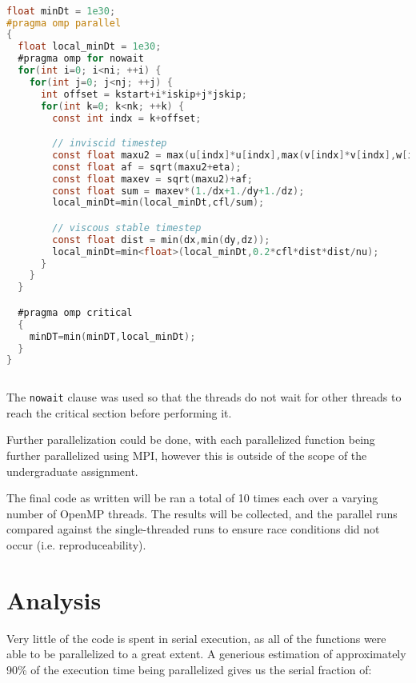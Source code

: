 \documentclass{article}
\begin{document}
  \begin{lstfloat}
  \begin{lstlisting}[language=C, 
                     linewidth=1\textwidth,
                     breaklines=true, 
                     basicstyle=\small\ttfamily]

float minDt = 1e30;
#pragma omp parallel
{
  float local_minDt = 1e30;
  #pragma omp for nowait
  for(int i=0; i<ni; ++i) {
    for(int j=0; j<nj; ++j) {
      int offset = kstart+i*iskip+j*jskip;
      for(int k=0; k<nk; ++k) {
        const int indx = k+offset;

        // inviscid timestep
        const float maxu2 = max(u[indx]*u[indx],max(v[indx]*v[indx],w[indx]*w[indx]));
        const float af = sqrt(maxu2+eta);
        const float maxev = sqrt(maxu2)+af;
        const float sum = maxev*(1./dx+1./dy+1./dz);
        local_minDt=min(local_minDt,cfl/sum);

        // viscous stable timestep
        const float dist = min(dx,min(dy,dz));
        local_minDt=min<float>(local_minDt,0.2*cfl*dist*dist/nu);
      }
    }
  }

  #pragma omp critical
  {
    minDT=min(minDT,local_minDt);
  }
}
    
  \end{lstlisting}
  \end{lstfloat}

  The \verb|nowait| clause was used so that the threads do not wait for other
  threads to reach the critical section before performing it.

  Further parallelization could be done, with each parallelized function being
  further parallelized using MPI, however this is outside of the scope of the
  undergraduate assignment.

  The final code as written will be ran a total of 10 times each over a varying
  number of OpenMP threads. The results will be collected, and the parallel
  runs compared against the single-threaded runs to ensure race conditions did
  not occur (i.e. reproduceability).

  \section{Analysis}

  Very little of the code is spent in serial execution, as all of the functions
  were able to be parallelized to a great extent. A generious estimation of
  approximately 90\% of the execution time being parallelized gives us the
  serial fraction of:
\end{document}
